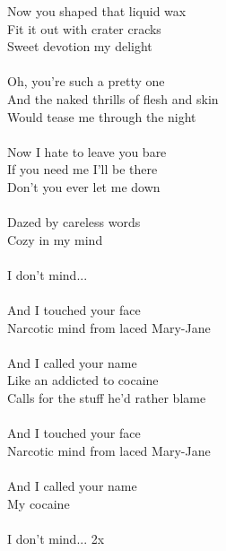 \begin{multicols}{2}
Now you shaped that liquid wax\\
Fit it out with crater cracks\\
Sweet devotion my delight\\
\\
Oh, you're such a pretty one\\
And the naked thrills of flesh and skin\\
Would tease me through the night\\
\\
Now I hate to leave you bare\\
If you need me I'll be there\\
Don't you ever let me down\\
\\
Dazed by careless words\\
Cozy in my mind\\
\\
I don't mind...\\
\columnbreak
\\
And I touched your face\\
Narcotic mind from laced Mary-Jane\\
\\
And I called your name\\
Like an addicted to cocaine\\
Calls for the stuff he'd rather blame\\
\\
And I touched your face\\
Narcotic mind from laced Mary-Jane\\
\\
And I called your name\\
My cocaine\\
\\
I don't mind... 2x\\
\end{multicols}
